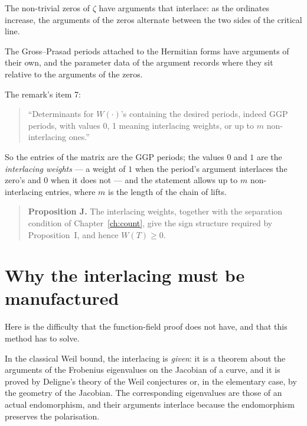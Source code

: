 \begin{description}[style=nextline,leftmargin=0pt,labelwidth=0pt,labelsep=0pt,font=\sffamily\bfseries\small,
  itemsep=6pt]
\item[Zeros.] The non-trivial zeros of $\zeta$ have arguments that interlace:
as the ordinates increase, the arguments of the zeros alternate between the
two sides of the critical line.
\item[Periods.] The Gross--Prasad periods attached to the Hermitian forms
have arguments of their own, and the parameter data of the argument records
where they sit relative to the arguments of the zeros.
\end{description}

The remark's item 7:

\begin{quote}
\small
``Determinants for $W(\cdot)$'s containing the desired periods, indeed GGP
periods, with values 0, 1 meaning interlacing weights, or up to $m$
non-interlacing ones.''
\end{quote}

So the entries of the matrix are the GGP periods; the values $0$ and $1$ are
the \emph{interlacing weights} --- a weight of $1$ when the period's argument
interlaces the zero's and $0$ when it does not --- and the statement allows up
to $m$ non-interlacing entries, where $m$ is the length of the chain of
lifts.

\begin{quote}
\textbf{Proposition J.} The interlacing weights, together with the separation
condition of Chapter~\ref{ch:count}, give the sign structure required by
Proposition~I, and hence $W(T) \ge 0$.
\end{quote}

\section{Why the interlacing must be manufactured}Here is the difficulty that the function-field proof does not have, and that
this method has to solve.

In the classical Weil bound, the interlacing is \emph{given}: it is a theorem
about the arguments of the Frobenius eigenvalues on the Jacobian of a curve,
and it is proved by Deligne's theory of the Weil conjectures or, in the
elementary case, by the geometry of the Jacobian. The corresponding
eigenvalues are those of an actual endomorphism, and their arguments
interlace because the endomorphism preserves the polarisation.

